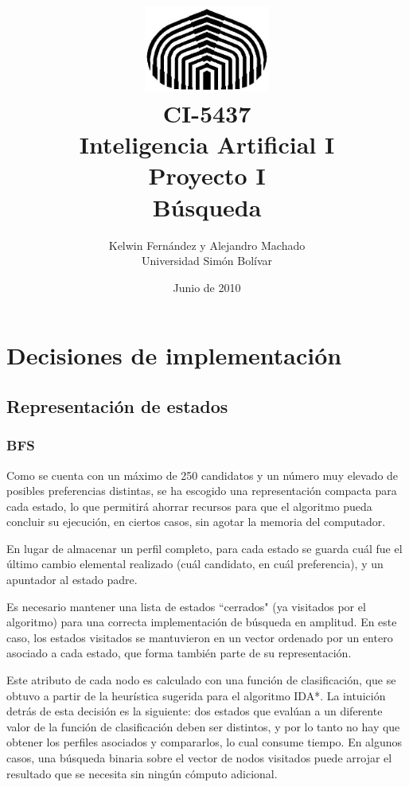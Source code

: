 \documentclass[letterpaper,12pt, titlepage]{article}
\begin{document}
\title{	\includegraphics[height=80pt]{usb.jpg} \\
CI-5437 \\ Inteligencia Artificial I \\
Proyecto I\\
Búsqueda}
\author{Kelwin Fernández y Alejandro Machado\\
	Universidad Simón Bolívar} 
\date{Junio de 2010} 
\maketitle

\section{Decisiones de implementación}

\subsection*{Representación de estados}

\subsubsection*{BFS}
   Como se cuenta con un máximo de 250 candidatos y un número muy elevado
   de posibles preferencias distintas, se ha escogido una representación compacta 
   para cada estado, lo que permitirá ahorrar recursos para que el algoritmo
   pueda concluir su ejecución, en ciertos casos, sin agotar la memoria del computador.

   En lugar de almacenar un perfil completo, para cada estado
   se guarda cuál fue el último cambio elemental realizado (cuál candidato, en cuál
   preferencia), y un apuntador al estado padre.

    Es necesario mantener una lista de estados ``cerrados" (ya visitados por el
    algoritmo) para una correcta implementación de búsqueda en amplitud.
    En este caso, los estados visitados se mantuvieron en un vector ordenado
    por un entero asociado a cada estado, que forma también parte de su representación.

    Este atributo de cada nodo es calculado con una función de clasificación, que
    se obtuvo a partir de la heurística sugerida para el algoritmo IDA*. La intuición
    detrás de esta decisión es la siguiente:
     dos estados que evalúan a un diferente valor de la función de clasificación
    deben ser distintos, y por lo tanto no hay que obtener los perfiles asociados
    y compararlos, lo cual consume tiempo. En algunos casos, una búsqueda binaria
    sobre el vector de nodos visitados puede arrojar el resultado que se necesita
    sin ningún cómputo adicional.
\end{document}
